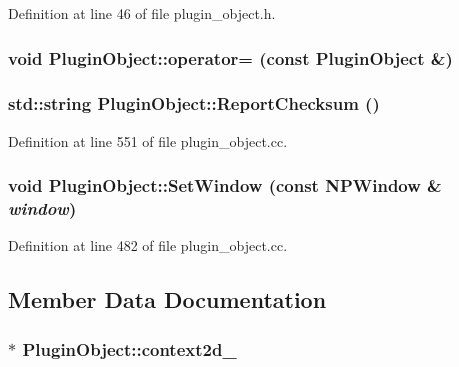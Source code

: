 Definition at line 46 of file plugin\_\-object.h.

\hypertarget{class_plugin_object_a45243a3f962f41eb71fe0eeba7501262}{
\subsubsection[{operator=}]{\setlength{\rightskip}{0pt plus 5cm}void PluginObject::operator= (const {\bf PluginObject} \&)}}
\label{class_plugin_object_a45243a3f962f41eb71fe0eeba7501262}
\hypertarget{class_plugin_object_a0ab936e960c08282554224a4570540aa}{
\subsubsection[{ReportChecksum}]{\setlength{\rightskip}{0pt plus 5cm}std::string PluginObject::ReportChecksum ()}}
\label{class_plugin_object_a0ab936e960c08282554224a4570540aa}


Definition at line 551 of file plugin\_\-object.cc.

\hypertarget{class_plugin_object_a2a2774a67eadffc3f78d60e6c0559cf0}{
\subsubsection[{SetWindow}]{\setlength{\rightskip}{0pt plus 5cm}void PluginObject::SetWindow (const {\bf NPWindow} \& {\em window})}}
\label{class_plugin_object_a2a2774a67eadffc3f78d60e6c0559cf0}


Definition at line 482 of file plugin\_\-object.cc.



\subsection{Member Data Documentation}
\hypertarget{class_plugin_object_ac4e47e096e7046c00152e0979a120059}{
\subsubsection[{context2d\_\-}]{$\ast$ {\bf PluginObject::context2d\_\-}}}
\label{class_plugin_object_ac4e47e096e7046c00152e0979a120059}


